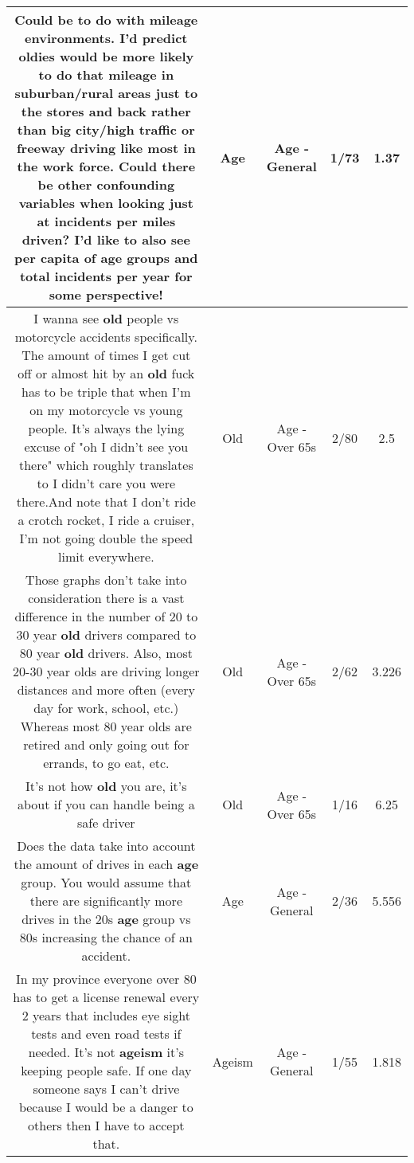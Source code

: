 \documentclass[11pt]{article}
\newlength\mylength
\begin{document}
\begin{center}
\begin{longtable}{|C{.65\mylength}|C{.30\mylength}|C{.12\mylength}|C{.12\mylength}|C{.12\mylength}|}
  \small Could be to do with mileage environments. I'd predict oldies would be more likely to do that mileage in suburban/rural areas just to the stores and back rather than big city/high traffic or freeway driving like most in the work force. Could there be other confounding variables when looking just at incidents per miles driven? I'd like to also see per capita of \textbf{age} groups and total incidents per year for some perspective!\normalsize   & Age & Age - General & 1/73 & 1.37 \\  \hline
  \small I wanna see \textbf{old} people vs motorcycle accidents specifically. The amount of times I get cut off or almost hit by an \textbf{old} fuck has to be triple that when I'm on my motorcycle vs young people. It's always the lying excuse of "oh I didn't see you there" which roughly translates to I didn't care you were there.And note that I don't ride a crotch rocket, I ride a cruiser, I'm not going double the speed limit everywhere.\normalsize   & Old & Age - Over 65s & 2/80 & 2.5 \\  \hline
  \small Those graphs don't take into consideration there is a vast difference in the number of 20 to 30 year \textbf{old} drivers compared to 80 year \textbf{old} drivers. Also, most 20-30 year olds are driving longer distances and more often (every day for work, school, etc.) Whereas most 80 year olds are retired and only going out for errands, to go eat, etc.\normalsize   & Old & Age - Over 65s & 2/62 & 3.226 \\  \hline
  \small It's not how \textbf{old} you are, it's about if you can handle being a safe driver\normalsize   & Old & Age - Over 65s & 1/16 & 6.25 \\  \hline
  \small Does the data take into account the amount of drives in each \textbf{age} group. You would assume that there are significantly more drives in the 20s \textbf{age} group vs 80s increasing the chance of an accident.\normalsize   & Age & Age - General & 2/36 & 5.556 \\  \hline
  \small In my province everyone over 80 has to get a license renewal every 2 years that includes eye sight tests and even road tests if needed. It's not \textbf{ageism} it's keeping people safe. If one day someone says I can't drive because I would be a danger to others then I have to accept that.\normalsize   & Ageism & Age - General & 1/55 & 1.818 \\  \hline

\end{longtable}
\end{center}
\end{document}
